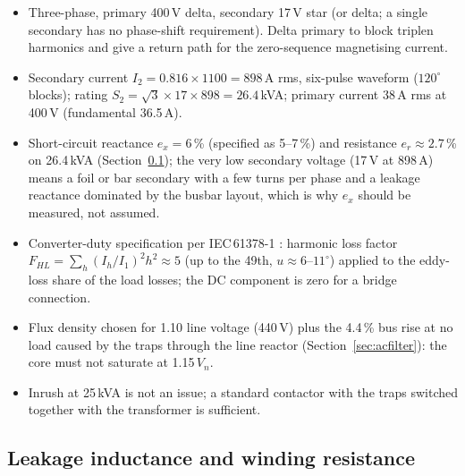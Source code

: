\documentclass[11pt,a4paper]{article}
\newcommand{\ex}{e_x}
\begin{document}
\begin{itemize}
\item Three-phase, primary 400\,V delta, secondary 17\,V star (or delta; a single secondary has no phase-shift requirement). Delta primary to block triplen harmonics and give a return path for the zero-sequence magnetising current.
\item Secondary current $I_2 = 0.816 \times 1100 = 898$\,A rms, six-pulse waveform ($120^\circ$ blocks); rating $S_2 = \sqrt3 \times 17 \times 898 = 26.4$\,kVA; primary current 38\,A rms at 400\,V (fundamental 36.5\,A).
\item Short-circuit reactance $\ex = 6$\,\% (specified as 5--7\,\%) and resistance $e_r \approx 2.7$\,\% on 26.4\,kVA (Section~\ref{sec:lr}); the very low secondary voltage (17\,V at 898\,A) means a foil or bar secondary with a few turns per phase and a leakage reactance dominated by the busbar layout, which is why $\ex$ should be measured, not assumed.
\item Converter-duty specification per IEC\,61378-1 \cite{iec61378}: harmonic loss factor $F_{HL} = \sum_h (I_h/I_1)^2h^2 \approx 5$ (up to the 49th, $u \approx 6$--$11^\circ$) applied to the eddy-loss share of the load losses; the DC component is zero for a bridge connection.
\item Flux density chosen for 1.10 line voltage (440\,V) plus the 4.4\,\% bus rise at no load caused by the traps through the line reactor (Section~\ref{sec:acfilter}): the core must not saturate at 1.15\,$V_n$.
\item Inrush at 25\,kVA is not an issue; a standard contactor with the traps switched together with the transformer is sufficient.
\end{itemize}


\subsection{Leakage inductance and winding resistance}
\label{sec:lr}
\end{document}

